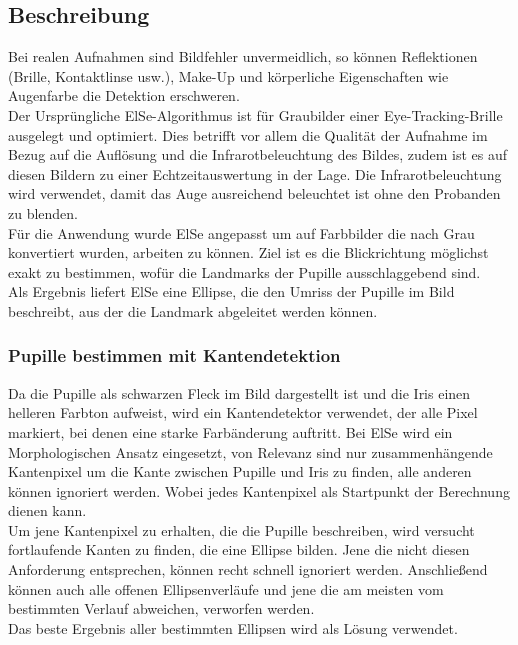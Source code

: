 \subsection{Beschreibung}
Bei realen Aufnahmen sind Bildfehler unvermeidlich, so können Reflektionen (Brille, Kontaktlinse usw.), Make-Up und körperliche Eigenschaften wie Augenfarbe die Detektion erschweren.\\
Der Ursprüngliche ElSe-Algorithmus ist für Graubilder einer Eye-Tracking-Brille ausgelegt und optimiert. Dies betrifft vor allem die Qualität der Aufnahme im Bezug auf die Auflösung und die Infrarotbeleuchtung des Bildes, zudem ist es auf diesen Bildern zu einer Echtzeitauswertung in der Lage. Die Infrarotbeleuchtung wird verwendet, damit das Auge ausreichend beleuchtet ist ohne den Probanden zu blenden.\\
Für die Anwendung wurde ElSe angepasst um auf Farbbilder die nach Grau konvertiert wurden, arbeiten zu können. Ziel ist es die Blickrichtung möglichst exakt zu bestimmen, wofür die Landmarks der Pupille ausschlaggebend sind.\\
Als Ergebnis liefert ElSe eine Ellipse, die den Umriss der Pupille im Bild beschreibt, aus der die Landmark abgeleitet werden können.
\subsubsection{Pupille bestimmen mit Kantendetektion}
Da die Pupille als schwarzen Fleck im Bild dargestellt ist und die Iris einen helleren Farbton aufweist, wird ein Kantendetektor verwendet, der alle Pixel markiert, bei denen eine starke Farbänderung auftritt. Bei ElSe wird ein Morphologischen Ansatz eingesetzt, von Relevanz sind nur zusammenhängende Kantenpixel um die Kante zwischen Pupille und Iris zu finden, alle anderen können ignoriert werden. Wobei jedes Kantenpixel als Startpunkt der Berechnung dienen kann.\\
Um jene Kantenpixel zu erhalten, die die Pupille beschreiben, wird versucht fortlaufende Kanten zu finden, die eine Ellipse bilden. Jene die nicht diesen Anforderung entsprechen, können recht schnell ignoriert werden. Anschließend können auch alle offenen Ellipsenverläufe und jene die am meisten vom bestimmten Verlauf abweichen, verworfen werden.\\
Das beste Ergebnis aller bestimmten Ellipsen wird als Lösung verwendet.
